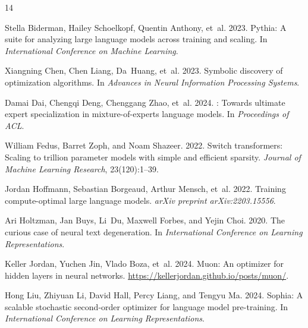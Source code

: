\documentclass[11pt]{article}
\begin{document}
\begin{thebibliography}{14}
\providecommand{\natexlab}[1]{#1}

Stella Biderman, Hailey Schoelkopf, Quentin Anthony, et~al. 2023.
\newblock Pythia: A suite for analyzing large language models across training
  and scaling.
\newblock In \emph{International Conference on Machine Learning}.

Xiangning Chen, Chen Liang, Da~Huang, et~al. 2023.
\newblock Symbolic discovery of optimization algorithms.
\newblock In \emph{Advances in Neural Information Processing Systems}.

Damai Dai, Chengqi Deng, Chenggang Zhao, et~al. 2024.
: Towards ultimate expert specialization in
  mixture-of-experts language models.
\newblock In \emph{Proceedings of ACL}.

William Fedus, Barret Zoph, and Noam Shazeer. 2022.
\newblock Switch transformers: Scaling to trillion parameter models with simple
  and efficient sparsity.
\newblock \emph{Journal of Machine Learning Research}, 23(120):1--39.

Jordan Hoffmann, Sebastian Borgeaud, Arthur Mensch, et~al. 2022.
\newblock Training compute-optimal large language models.
\newblock \emph{arXiv preprint arXiv:2203.15556}.

Ari Holtzman, Jan Buys, Li~Du, Maxwell Forbes, and Yejin Choi. 2020.
\newblock The curious case of neural text degeneration.
\newblock In \emph{International Conference on Learning Representations}.

Keller Jordan, Yuchen Jin, Vlado Boza, et~al. 2024.
\newblock Muon: An optimizer for hidden layers in neural networks.
\newblock \url{https://kellerjordan.github.io/posts/muon/}.

Hong Liu, Zhiyuan Li, David Hall, Percy Liang, and Tengyu Ma. 2024.
\newblock Sophia: A scalable stochastic second-order optimizer for language
  model pre-training.
\newblock In \emph{International Conference on Learning Representations}.


\end{thebibliography}
\end{document}
